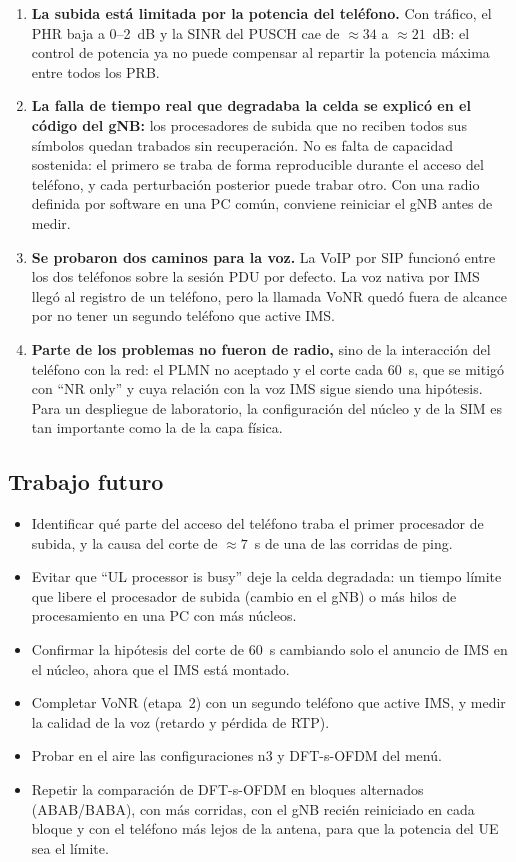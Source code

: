 \begin{enumerate}
  \item \textbf{La subida está limitada por la potencia del teléfono.} Con tráfico, el PHR baja a 0--2~dB y la SINR del PUSCH cae de $\approx 34$ a $\approx 21$~dB: el control de potencia ya no puede compensar al repartir la potencia máxima entre todos los PRB.
  \item \textbf{La falla de tiempo real que degradaba la celda se explicó en el código del gNB:} los procesadores de subida que no reciben todos sus símbolos quedan trabados sin recuperación. No es falta de capacidad sostenida: el primero se traba de forma reproducible durante el acceso del teléfono, y cada perturbación posterior puede trabar otro. Con una radio definida por software en una PC común, conviene reiniciar el gNB antes de medir.
  \item \textbf{Se probaron dos caminos para la voz.} La VoIP por SIP funcionó entre los dos teléfonos sobre la sesión PDU por defecto. La voz nativa por IMS llegó al registro de un teléfono, pero la llamada VoNR quedó fuera de alcance por no tener un segundo teléfono que active IMS.
  \item \textbf{Parte de los problemas no fueron de radio,} sino de la interacción del teléfono con la red: el PLMN no aceptado y el corte cada 60~s, que se mitigó con ``NR only'' y cuya relación con la voz IMS sigue siendo una hipótesis. Para un despliegue de laboratorio, la configuración del núcleo y de la SIM es tan importante como la de la capa física.
\end{enumerate}

\subsection{Trabajo futuro}\label{sec:trabajo_futuro}
\begin{itemize}
  \item Identificar qué parte del acceso del teléfono traba el primer procesador de subida, y la causa del corte de $\approx 7$~s de una de las corridas de ping.
  \item Evitar que ``UL processor is busy'' deje la celda degradada: un tiempo límite que libere el procesador de subida (cambio en el gNB) o más hilos de procesamiento en una PC con más núcleos.
  \item Confirmar la hipótesis del corte de 60~s cambiando solo el anuncio de IMS en el núcleo, ahora que el IMS está montado.
  \item Completar VoNR (etapa~2) con un segundo teléfono que active IMS, y medir la calidad de la voz (retardo y pérdida de RTP).
  \item Probar en el aire las configuraciones n3 y DFT-s-OFDM del menú.
  \item Repetir la comparación de DFT-s-OFDM en bloques alternados (ABAB/BABA), con más corridas, con el gNB recién reiniciado en cada bloque y con el teléfono más lejos de la antena, para que la potencia del UE sea el límite.
\end{itemize}
